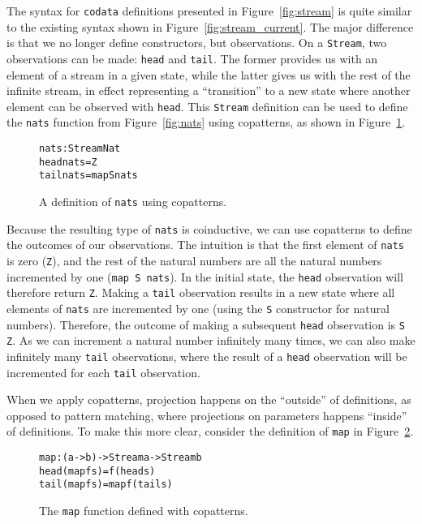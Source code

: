 The syntax for \texttt{codata} definitions presented in Figure~\ref{fig:stream} is quite similar to the existing syntax shown in Figure~\ref{fig:stream_current}. The major difference is that we no longer define constructors, but observations. On a \texttt{Stream}, two observations can be made: \texttt{head} and \texttt{tail}. The former provides us with an element of a stream in a given state, while the latter gives us with the rest of the infinite stream, in effect representing a ``transition'' to a new state where another element can be observed with \texttt{head}. This \texttt{Stream} definition can be used to define the \texttt{nats} function from Figure~\ref{fig:nats} using copatterns, as shown in Figure~\ref{fig:nats_copatterns}.

\begin{figure}
\begin{alltt}
nats : Stream Nat
head nats = Z
tail nats = map S nats
\end{alltt}
\caption{A definition of \texttt{nats} using copatterns.}
\label{fig:nats_copatterns}
\end{figure}

Because the resulting type of \texttt{nats} is coinductive, we can use copatterns to define the outcomes of our observations. The intuition is that the first element of \texttt{nats} is zero (\texttt{Z}), and the rest of the natural numbers are all the natural numbers incremented by one (\texttt{map S nats}). In the initial state, the \texttt{head} observation will therefore return \texttt{Z}. Making a \texttt{tail} observation results in a new state where all elements of \texttt{nats} are incremented by one (using the \texttt{S} constructor for natural numbers). Therefore, the outcome of making a subsequent \texttt{head} observation is \texttt{S Z}. As we can increment a natural number infinitely many times, we can also make infinitely many \texttt{tail} observations, where the result of a \texttt{head} observation will be incremented for each \texttt{tail} observation. 

When we apply copatterns, projection happens on the ``outside'' of definitions, as opposed to pattern matching, where projections on parameters happens ``inside'' of definitions. To make this more clear, consider the definition of \texttt{map} in Figure~\ref{fig:map_copatterns}.

\begin{figure}
\begin{alltt}
map : (a -> b) -> Stream a -> Stream b
head (map f s) = f (head s)
tail (map f s) = map f (tail s)
\end{alltt}
\caption{The \texttt{map} function defined with copatterns.}
\label{fig:map_copatterns}
\end{figure}

